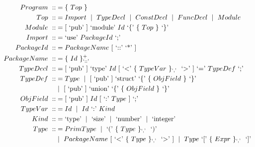 \documentclass[letterpaper]{article}
\newcommand{\nonterminal}[1]{#1\ }
\newcommand{\terminal}[1]{\text{`#1'}\ }
\newcommand{\gramOption}[1]{[\ #1]\ }
\newcommand*{\gramRepeat}[2][]{\{\ #2\}_{#1}\ }
\newcommand*{\gramSome}[2][]{\{\ #2\}^{+}_{#1}\ }
\newcommand{\gramOr}{\mid\ }
\begin{document}
\begin{align*}
%  
  \nonterminal{Program} ::&= \gramRepeat{\nonterminal{Top}} \\
%
  \nonterminal{Top} ::&= \nonterminal{Import}
    \gramOr \nonterminal{TypeDecl}
    \gramOr \nonterminal{ConstDecl}
    \gramOr \nonterminal{FuncDecl}
    \gramOr \nonterminal{Module} \\
%
  \nonterminal{Module} ::&=
    \gramOption{\terminal{pub}} \terminal{module} \nonterminal {Id}
      \terminal{\{} \gramRepeat{\nonterminal{Top}} \terminal{\}} \\
%
  \nonterminal{Import} ::&=
    \terminal{use} \nonterminal{PackageId} \terminal{;} \\
%
  \nonterminal{PackageId} ::&=
    \nonterminal{PackageName} \gramOption{\terminal{::} \terminal{*}} \\
%
  \nonterminal{PackageName} ::&= \gramSome[\terminal{::}]{\nonterminal{Id}} \\
%
  \nonterminal{TypeDecl} ::&=
    \gramOption{\terminal{pub}} \terminal{type} \nonterminal{Id}
      \gramOption{\terminal{\textless}
        \gramRepeat[\terminal{,}]{\nonterminal{TypeVar}} \terminal{\textgreater}}
      \terminal{=} \nonterminal{TypeDef} \terminal{;} \\
%
  \nonterminal{TypeDef} ::&= \nonterminal{Type}
    \gramOr \gramOption{\terminal{pub}} \terminal{struct}
      \terminal{\{} \gramRepeat{\nonterminal{ObjField}} \terminal{\}} \\
    &\gramOr \gramOption{\terminal{pub}} \terminal{union}
      \terminal{\{} \gramRepeat{\nonterminal{ObjField}} \terminal{\}} \\
%
  \nonterminal{ObjField} ::&=
    \gramOption{\terminal{pub}} \nonterminal{Id}
      \gramOption{\terminal{:} \nonterminal{Type}} \terminal{;} \\
%
  \nonterminal{TypeVar} ::&= \nonterminal{Id}
    \gramOr \nonterminal{Id} \terminal{:} \nonterminal{Kind} \\
%
  \nonterminal{Kind} ::&= \terminal{type} \gramOr \terminal{size}
    \gramOr \terminal{number} \gramOr \terminal{integer} \\
%
  \nonterminal{Type} ::&= \nonterminal{PrimType}
    \gramOr \terminal{(} \gramRepeat[\terminal{,}]{\nonterminal{Type}} \terminal{)} \\
    &\gramOr \nonterminal{PackageName}
      \gramOption{\terminal{\textless}
        \gramRepeat[\terminal{,}]{\nonterminal{Type}} \terminal{\textgreater}}
    \gramOr \nonterminal{Type}
      \terminal{[} \gramRepeat[\terminal{,}]{\nonterminal{Expr}} \terminal{]} \\

\end{align*}
\end{document}
